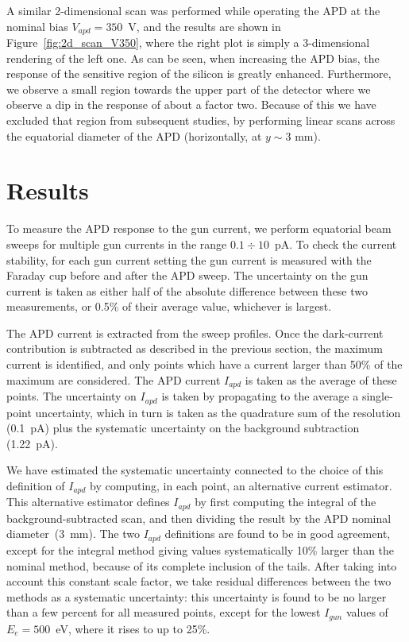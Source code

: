 \documentclass[12p]{paper}
\begin{document}
A similar 2-dimensional scan was performed while operating the APD at the nominal bias $V_{apd}=350$~V, and the results are shown in Figure~\ref{fig:2d_scan_V350}, where the right plot is simply a 3-dimensional rendering of the left one. As can be seen, when increasing the APD bias, the response of the sensitive region of the silicon is greatly enhanced. Furthermore, we observe a small region towards the upper part of the detector where we observe a dip in the response of about a factor two. Because of this we have excluded that region from subsequent studies, by performing linear scans across the equatorial diameter of the APD (horizontally, at $y\sim 3$ mm).
\clearpage

\section{Results}

To measure the APD response to the gun current, we perform equatorial beam sweeps for multiple gun currents in the range $0.1 \div 10$~pA. To check the current stability, for each gun current setting the gun current is measured with the Faraday cup before and after the APD sweep. The uncertainty on the gun current is taken as either half of the absolute difference between these two measurements, or 0.5\% of their average value, whichever is largest.

The APD current is extracted from the sweep profiles. Once the dark-current contribution is subtracted as described in the previous section, the maximum current is identified, and only points which have a current larger than 50\% of the maximum are considered. The APD current $I_{apd}$ is taken as the average of these points. The uncertainty on $I_{apd}$ is taken by propagating to the average a single-point uncertainty, which in turn is taken as the quadrature sum of the resolution (0.1~pA) plus the systematic uncertainty on the background subtraction (1.22~pA).

We have estimated the systematic uncertainty connected to the choice of this definition of $I_{apd}$ by computing, in each point, an alternative current estimator. This alternative estimator defines $I_{apd}$ by first computing the integral of the background-subtracted scan, and then dividing the result by the APD nominal diameter~(3~mm). The two $I_{apd}$ definitions are found to be in good agreement,  except for the integral method giving values systematically 10\% larger than the nominal method, because of its complete inclusion of the tails. After taking into account this constant scale factor, we take residual differences between the two methods as a systematic uncertainty: this uncertainty is found to be no larger than a few percent for all measured points, except for the lowest $I_{gun}$ values of $E_e = 500$~eV, where it rises to up to 25\%. 
\end{document}
